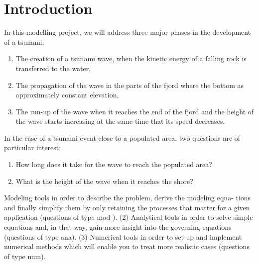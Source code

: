 
\chapter{Introduction} %

\label{Chapter1} %


\newcommand{\keyword}[1]{\textbf{#1}}
\newcommand{\tabhead}[1]{\textbf{#1}}
\newcommand{\code}[1]{\texttt{#1}}
\newcommand{\file}[1]{\texttt{\bfseries#1}}
\newcommand{\option}[1]{\texttt{\itshape#1}}


In this modelling project, we will address three major phases in the development of a tsunami:
\begin{enumerate}[label = \emph{(\roman*)}]
    \item    The creation of a tsunami wave, when the kinetic energy of a falling rock is transferred to the
             water,
    \item    The propagation of the wave in the parts of the fjord where the bottom as approximately constant
             elevation,
    \item    The run-up of the wave when it reaches the end of the fjord and the height of the wave starts
             increasing at the same time that its speed decreases.
\end{enumerate}

In the case of a tsunami event close to a populated area, two questions are of particular interest:
\begin{enumerate}[label = \emph{(\roman*)}]
    \item    How long does it take for the wave to reach the populated area?
    \item    What is the height of the wave when it reaches the shore?
\end{enumerate}

Modeling tools in order to describe the problem, derive the modeling equa-
tions and finally simplify them by only retaining the processes that matter
for a given application (questions of type mod ).
(2) Analytical tools in order to solve simple equations and, in that way, gain
more insight into the governing equations (questions of type ana).
(3) Numerical tools in order to set up and implement numerical methods which
will enable you to treat more realistic cases (questions of type num).